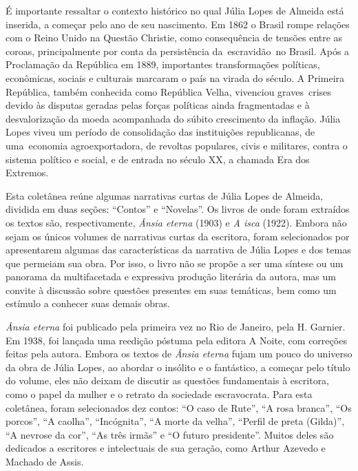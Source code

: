 \documentclass[12pt]{extarticle}
\begin{document}
É importante ressaltar o contexto histórico no qual Júlia Lopes de
Almeida está inserida, a começar pelo ano de seu nascimento. Em 1862 o
Brasil rompe relações com o Reino Unido na Questão Christie, como
consequência de tensões entre as coroas, principalmente por conta da
persistência da~escravidão~no Brasil. Após a Proclamação da República em
1889, importantes transformações políticas, econômicas, sociais e
culturais marcaram o país na virada do século. A Primeira República,
também conhecida como República Velha, vivenciou graves~crises devido às
disputas geradas pelas forças políticas ainda fragmentadas e à
desvalorização da moeda acompanhada do súbito crescimento da inflação.
Júlia Lopes viveu um período de consolidação das instituições
republicanas, de uma~economia agroexportadora, de revoltas populares,
civis e militares, contra o sistema político e social, e de entrada no
século \textsc{XX}, a chamada Era dos Extremos.

Esta coletânea reúne algumas narrativas curtas de Júlia Lopes de
Almeida, dividida em duas seções: ``Contos'' e ``Novelas''. Os livros de
onde foram extraídos os textos são, respectivamente, \emph{Ânsia eterna}
(1903) e \emph{A isca} (1922). Embora não sejam os únicos volumes de
narrativas curtas da escritora, foram selecionados por apresentarem
algumas das características da narrativa de Júlia Lopes e dos temas que
permeiam sua obra. Por isso, o livro não se propõe a ser uma síntese ou
um panorama da multifacetada e expressiva produção literária da autora,
mas um convite à discussão sobre questões presentes em suas temáticas,
bem como um estímulo a conhecer suas demais obras.

\emph{Ânsia eterna} foi publicado pela primeira vez no Rio de Janeiro,
pela H. Garnier. Em 1938, foi lançada uma reedição póstuma pela editora
A Noite, com correções feitas pela autora. Embora os textos de
\emph{Ânsia eterna} fujam um pouco do universo da obra de Júlia Lopes,
ao abordar o insólito e o fantástico, a começar pelo título do volume,
eles não deixam de discutir as questões fundamentais à escritora, como o
papel da mulher e o retrato da sociedade escravocrata. Para esta
coletânea, foram selecionados dez contos: ``O caso de Rute'', ``A rosa
branca'', ``Os porcos'', ``A caolha'', ``Incógnita'', ``A morte da
velha'', ``Perfil de preta (Gilda)'', ``A nevrose da cor'', ``As três
irmãs'' e ``O futuro presidente''. Muitos deles são dedicados a
escritores e intelectuais de sua geração, como Arthur Azevedo e Machado
de Assis.
\end{document}
